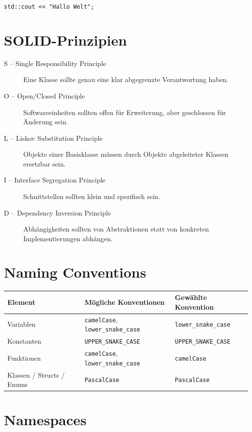\documentclass[11pt,a4paper]{article}
\newcommand{\code}[1]{\texttt{#1}}
\begin{document}
\begin{lstlisting}[caption={Zugriff auf einen Namen im Namespace std}]
std::cout << "Hallo Welt";
\end{lstlisting}

\section{SOLID-Prinzipien}
\begin{description}
  \item[S -- Single Responsibility Principle] Eine Klasse sollte genau eine klar abgegrenzte Verantwortung haben.
  \item[O -- Open/Closed Principle] Softwareeinheiten sollten offen für Erweiterung, aber geschlossen für Änderung sein.
  \item[L -- Liskov Substitution Principle] Objekte einer Basisklasse müssen durch Objekte abgeleiteter Klassen ersetzbar sein.
  \item[I -- Interface Segregation Principle] Schnittstellen sollten klein und spezifisch sein.
  \item[D -- Dependency Inversion Principle] Abhängigkeiten sollten von Abstraktionen statt von konkreten Implementierungen abhängen.
\end{description}

\section{Naming Conventions}

\begin{center}
\begin{tabular}{lll}
\toprule
Element & Mögliche Konventionen & Gewählte Konvention \\
\midrule
Variablen & \code{camelCase}, \code{lower\_snake\_case} & \code{lower\_snake\_case} \\
Konstanten & \code{UPPER\_SNAKE\_CASE} & \code{UPPER\_SNAKE\_CASE} \\
Funktionen & \code{camelCase}, \code{lower\_snake\_case} & \code{camelCase} \\
Klassen / Structs / Enums & \code{PascalCase} & \code{PascalCase} \\
\bottomrule
\end{tabular}
\end{center}

\section{Namespaces}
\end{document}

